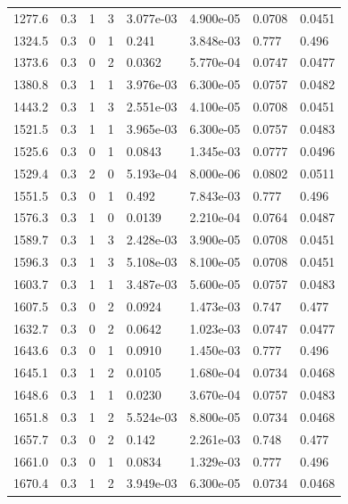 \documentclass[preview]{standalone}
\begin{document}
{{{\begin{tabular}{L{1.2cm}C{1.2cm} C{0.3cm}C{0.5cm} C{1.4cm}C{1.4cm} C{1.4cm}C{1.4cm}}
  1277.6  &   0.3  & 1     &  3 &  3.077e-03  & 4.900e-05  & 0.0708 &  0.0451   \\ 
  1324.5  &   0.3  & 0     &  1 &  0.241  & 3.848e-03  & 0.777 &  0.496   \\ 
  1373.6  &   0.3  & 0     &  2 &  0.0362  & 5.770e-04  & 0.0747 &  0.0477   \\ 
  1380.8  &   0.3  & 1     &  1 &  3.976e-03  & 6.300e-05  & 0.0757 &  0.0482   \\ 
  1443.2  &   0.3  & 1     &  3 &  2.551e-03  & 4.100e-05  & 0.0708 &  0.0451   \\ 
  1521.5  &   0.3  & 1     &  1 &  3.965e-03  & 6.300e-05  & 0.0757 &  0.0483   \\ 
  1525.6  &   0.3  & 0     &  1 &  0.0843  & 1.345e-03  & 0.0777 &  0.0496   \\ 
  1529.4  &   0.3  & 2     &  0 &  5.193e-04  & 8.000e-06  & 0.0802 &  0.0511   \\ 
  1551.5  &   0.3  & 0     &  1 &  0.492  & 7.843e-03  & 0.777 &  0.496   \\ 
  1576.3  &   0.3  & 1     &  0 &  0.0139  & 2.210e-04  & 0.0764 &  0.0487   \\ 
  1589.7  &   0.3  & 1     &  3 &  2.428e-03  & 3.900e-05  & 0.0708 &  0.0451   \\ 
  1596.3  &   0.3  & 1     &  3 &  5.108e-03  & 8.100e-05  & 0.0708 &  0.0451   \\ 
  1603.7  &   0.3  & 1     &  1 &  3.487e-03  & 5.600e-05  & 0.0757 &  0.0483   \\ 
  1607.5  &   0.3  & 0     &  2 &  0.0924  & 1.473e-03  & 0.747 &  0.477   \\ 
  1632.7  &   0.3  & 0     &  2 &  0.0642  & 1.023e-03  & 0.0747 &  0.0477   \\ 
  1643.6  &   0.3  & 0     &  1 &  0.0910  & 1.450e-03  & 0.777 &  0.496   \\ 
  1645.1  &   0.3  & 1     &  2 &  0.0105  & 1.680e-04  & 0.0734 &  0.0468   \\ 
  1648.6  &   0.3  & 1     &  1 &  0.0230  & 3.670e-04  & 0.0757 &  0.0483   \\ 
  1651.8  &   0.3  & 1     &  2 &  5.524e-03  & 8.800e-05  & 0.0734 &  0.0468   \\ 
  1657.7  &   0.3  & 0     &  2 &  0.142  & 2.261e-03  & 0.748 &  0.477   \\ 
  1661.0  &   0.3  & 0     &  1 &  0.0834  & 1.329e-03  & 0.777 &  0.496   \\ 
  1670.4  &   0.3  & 1     &  2 &  3.949e-03  & 6.300e-05  & 0.0734 &  0.0468   \\ 

\end{tabular}}}}
\end{document}
